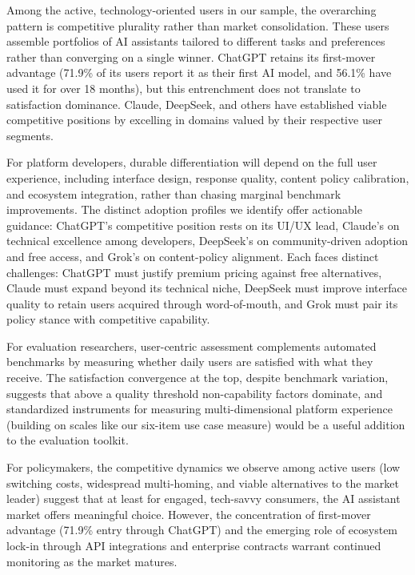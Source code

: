 \documentclass[10pt,twocolumn]{article}
\begin{document}
Among the active, technology-oriented users in our sample, the overarching pattern is competitive plurality rather than market consolidation. These users assemble portfolios of AI assistants tailored to different tasks and preferences rather than converging on a single winner. ChatGPT retains its first-mover advantage (71.9\% of its users report it as their first AI model, and 56.1\% have used it for over 18 months), but this entrenchment does not translate to satisfaction dominance. Claude, DeepSeek, and others have established viable competitive positions by excelling in domains valued by their respective user segments.

For platform developers, durable differentiation will depend on the full user experience, including interface design, response quality, content policy calibration, and ecosystem integration, rather than chasing marginal benchmark improvements. The distinct adoption profiles we identify offer actionable guidance: ChatGPT's competitive position rests on its UI/UX lead, Claude's on technical excellence among developers, DeepSeek's on community-driven adoption and free access, and Grok's on content-policy alignment. Each faces distinct challenges: ChatGPT must justify premium pricing against free alternatives, Claude must expand beyond its technical niche, DeepSeek must improve interface quality to retain users acquired through word-of-mouth, and Grok must pair its policy stance with competitive capability.

For evaluation researchers, user-centric assessment complements automated benchmarks by measuring whether daily users are satisfied with what they receive. The satisfaction convergence at the top, despite benchmark variation, suggests that above a quality threshold non-capability factors dominate, and standardized instruments for measuring multi-dimensional platform experience (building on scales like our six-item use case measure) would be a useful addition to the evaluation toolkit.

For policymakers, the competitive dynamics we observe among active users (low switching costs, widespread multi-homing, and viable alternatives to the market leader) suggest that at least for engaged, tech-savvy consumers, the AI assistant market offers meaningful choice. However, the concentration of first-mover advantage (71.9\% entry through ChatGPT) and the emerging role of ecosystem lock-in through API integrations and enterprise contracts warrant continued monitoring as the market matures.
\end{document}
